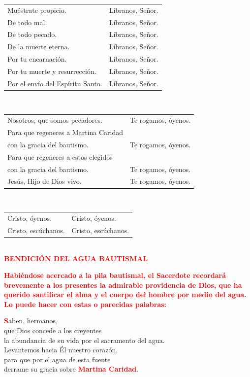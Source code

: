 \documentclass[12pt, letterpaper]{report}
\begin{document}
\begin{tabular}{ll}
Mu\'estrate propicio.& L\'ibranos, Se\~nor. \\
De todo mal.& L\'ibranos, Se\~nor. \\
De todo pecado.& L\'ibranos, Se\~nor. \\
De la muerte eterna.& L\'ibranos, Se\~nor. \\
Por tu encarnaci\'on.& L\'ibranos, Se\~nor. \\
Por tu muerte y resurrecci\'on.& L\'ibranos, Se\~nor. \\
Por el env\'io del Esp\'iritu Santo.& L\'ibranos, Se\~nor.
\end{tabular} \newline \\

\begin{tabular}{ll}
Nosotros, que somos pecadores.& Te rogamos, \'oyenos. \\
Para que regeneres a Martina Caridad \\
con la gracia del bautismo.& Te rogamos, \'oyenos. \\
Para que regeneres a estos elegidos \\
con la gracia del bautismo.& Te rogamos, \'oyenos. \\
Jes\'us, Hijo de Dios vivo.& Te rogamos, \'oyenos.
\end{tabular} \newline \\

\begin{tabular}{ll}
Cristo, \'oyenos.& Cristo, \'oyenos. \\
Cristo, esc\'uchanos.& Cristo, esc\'uchanos. \\
\end{tabular} \newline \\

\Large {\bfseries \textcolor{red}{BENDICI\'ON DEL AGUA BAUTISMAL}} \newline

\large {\bfseries \textcolor{red}{Habi\'endose acercado a la pila bautismal, el Sacerdote recordar\'a brevemente a los presentes la admirable providencia de Dios, que ha querido santificar el alma y el cuerpo del hombre por medio del agua. Lo puede hacer con estas o parecidas palabras:}} \newline

\lettrine[lines=1]{\bfseries \textcolor{red}{S}}{}\Large aben, hermanos, \\ 
que Dios concede a los creyentes \\
la abundancia de su vida por el sacramento del agua. \\
Levantemos hacia \'El nuestro coraz\'on, \\
para que por el agua de esta fuente \\
derrame su gracia sobre {\bfseries \textcolor{red}{Martina Caridad}}. \newline
\end{document}

